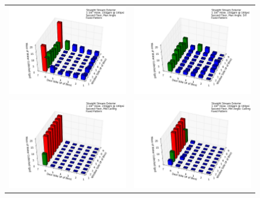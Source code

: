 \documentclass{article}
\begin{document}
\begin{figure}[ht]
\begin{tabular*}{\textwidth}{lr}
\includegraphics[width=3.2in]{../ADD_Analysis/Figures/15-12-07_145156_Datafile_Straight_Stream_Exterior.png} &
\includegraphics[width=3.2in]{../ADD_Analysis/Figures/15-12-07_151001_Datafile_Straight_Stream_Exterior.png} \\
\includegraphics[width=3.2in]{../ADD_Analysis/Figures/15-12-07_151630_Datafile_Straight_Stream_Exterior.png} &
\includegraphics[width=3.2in]{../ADD_Analysis/Figures/15-12-07_152028_Datafile_Straight_Stream_Exterior.png} \\

\end{tabular*}
\end{figure}
\end{document}
